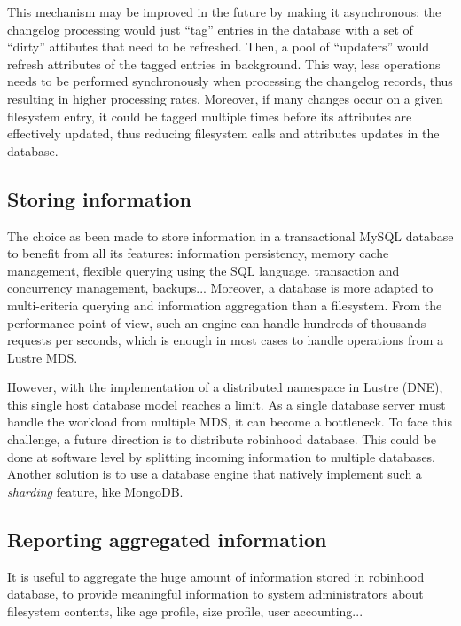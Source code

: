 \documentclass[conference]{IEEEtran}
\begin{document}
This mechanism may be improved in the future by making it asynchronous:
the changelog processing would just ``tag'' entries in the database with a set of ``dirty'' attibutes that need to be refreshed.
Then, a pool of ``updaters'' would refresh attributes of the tagged entries in background.
This way, less operations needs to be performed synchronously when processing the changelog records, thus resulting in higher processing rates. Moreover, if many changes occur on a given filesystem entry, it could be tagged multiple times before its attributes are effectively updated, thus reducing filesystem calls and attributes updates in the database.

\subsection{Storing information}

The choice as been made to store information in a tran\-sac\-tional MySQL database to benefit from all its features:
in\-for\-ma\-tion persistency, memory cache management, flexible querying using the SQL language, transaction and concurrency management, backups...
Moreover, a database is more adapted to multi-criteria querying and information aggregation than a filesystem.
From the performance point of view, such an engine can handle hundreds of thousands requests per seconds, which is enough in most cases to handle operations from a Lustre MDS.

However, with the implementation of a distributed name\-space in Lustre (DNE), this single host database model reaches a limit.
As a single database server must handle the workload from multiple MDS, it can become a bottleneck.
To face this challenge, a future direction is to distribute robinhood database. This could be done at software level by splitting incoming information to multiple databases. Another solution is to use a database engine that natively implement such a {\it sharding} feature,  like MongoDB\cite{Mongo}.

\subsection{Reporting aggregated information}

It is useful to aggregate the huge amount of information stored in robinhood database,
to provide meaningful information to system administrators about filesystem contents,
like age profile, size profile, user accounting...
\end{document}
